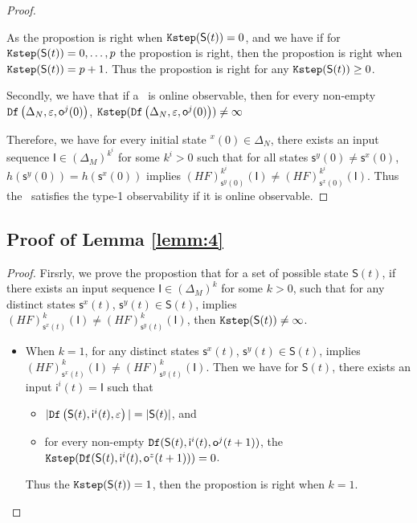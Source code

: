 \begin{appendices}
\begin{proof}
\begin{itemize}
\end{itemize}
As the propostion is right when ${\tt Kstep}(\mathsf{S}(t))=0$, and we have if for ${\tt Kstep}(\mathsf{S}(t))=0,\ldots, p$ the propostion is right, then the propostion is right when ${\tt Kstep}(\mathsf{S}(t))=p+1$. Thus the propostion is right for any ${\tt Kstep}(\mathsf{S}(t))\ge0$.

Secondly, we have that if a \BCN\ is online observable,
then for every  non-empty ${\tt Df}\left(\Delta_N,\varepsilon, \mathsf{o}^{j}(0)\right)$, ${\tt Kstep}({\tt Df}\left(\Delta_N,\varepsilon, \mathsf{o}^{j}(0)\right))\ne \infty$

Therefore, we have for every initial state \State$^{x}(0)$$\in \Delta_N$, there exists an input sequence $\mathsf{I}\in(\Delta_M)^{k^i}$ for some $k^i >0$ such that for all states $\mathsf{s}^{y}(0)\neq \mathsf{s}^{x}(0)$, $h(\mathsf{s}^{y}(0))=h(\mathsf{s}^{x}(0))$ implies $(HF)^{k^i}_{\mathsf{s}^{y}(0)}(\mathsf{I})\neq (HF)^{k^i}_{{\mathsf{s}^{x}(0)}}(\mathsf{I})$. Thus the \BCN\ satisfies the  type-1 observability if it is online observable.
\end{proof}

\subsection{Proof of Lemma \ref{lemm:4}}

\begin{proof}
Firsrly, we prove the propostion that for a set of possible state $\mathsf{S}(t)$, if there exists an input sequence $\mathsf{I}\in(\Delta_M)^{k}$ for some $k >0$, such that for any distinct states $\mathsf{s}^{x}(t)$, $\mathsf{s}^{y}(t) \in \mathsf{S}(t)$, implies $(HF)^{k}_{\mathsf{s}^{x}(t)}(\mathsf{I})\neq (HF)^{k}_{\mathsf{s}^{y}(t)}(\mathsf{I})$, then ${\tt Kstep}(\mathsf{S}(t))\ne\infty$.

\begin{itemize}
\item When $k=1$, for any distinct states $\mathsf{s}^{x}(t)$, $\mathsf{s}^{y}(t) \in \mathsf{S}(t)$, implies $(HF)^{k}_{\mathsf{s}^{x}(t)}(\mathsf{I})\neq (HF)^{k}_{\mathsf{s}^{y}(t)}(\mathsf{I})$. Then we have for $\mathsf{S}(t)$,
 there exists an input $\mathsf{i}^{i}(t)=\mathsf{I}$ such that
 \begin{itemize}
 \item  $|{\tt Df}\left(\mathsf{S}(t),\mathsf{i}^{i}(t),\varepsilon\right)|=|\mathsf{S}(t)|$, and 
 \item  for every non-empty ${\tt Df}(\mathsf{S}(t),\mathsf{i}^{i}(t),\mathsf{o}^{j}(t+1))$, the ${\tt Kstep}({\tt Df}(\mathsf{S}(t),\mathsf{i}^{i}(t),\mathsf{o}^{z}(t+1)))=0$.
 \end{itemize}
Thus the ${\tt Kstep}(\mathsf{S}(t))=1$, then the propostion is right when $k =1$.


\end{itemize}
\end{proof}
\end{appendices}
